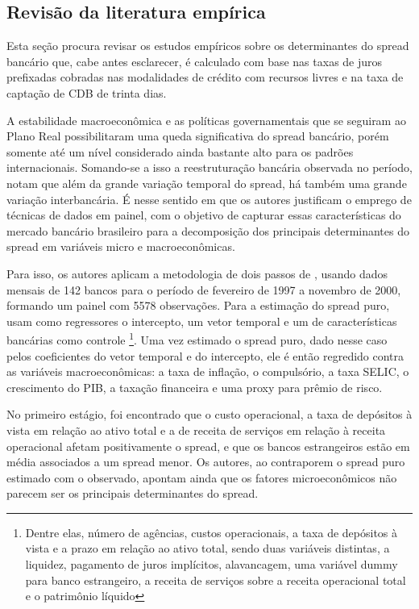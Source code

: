\documentclass[a4paper, article, 12pt, openany, oneside, english, brazil]{abntex2}
\numberwithin{equation}{section}
\begin{document}
\subsection{Revisão da literatura empírica}

    Esta seção procura revisar os estudos empíricos sobre os determinantes do spread bancário que, cabe antes esclarecer, é calculado com base nas taxas de juros prefixadas cobradas nas modalidades de crédito com recursos livres e na taxa de captação de CDB de trinta dias.

    A estabilidade macroeconômica e as políticas governamentais que se seguiram ao Plano Real possibilitaram uma queda significativa do spread bancário, porém somente até um nível considerado ainda bastante alto para os padrões internacionais. Somando-se a isso a reestruturação bancária observada no período,  notam que além da grande variação temporal do spread, há também uma grande variação interbancária. É nesse sentido em que os autores justificam o emprego de técnicas de dados em painel, com o objetivo de capturar essas características do mercado bancário brasileiro para a decomposição dos principais determinantes do spread em variáveis micro e macroeconômicas.

    Para isso, os autores aplicam a metodologia de dois passos de , usando dados mensais de 142 bancos para o período de fevereiro de 1997 a novembro de 2000, formando um painel com 5578 observações. Para a estimação do spread puro, usam como regressores o intercepto, um vetor temporal e um de características bancárias como controle \footnote{Dentre elas, número de agências, custos operacionais, a taxa de depósitos à vista e a prazo em relação ao ativo total, sendo duas variáveis distintas, a liquidez, pagamento de juros implícitos, alavancagem, uma variável dummy para banco estrangeiro, a receita de serviços sobre a receita operacional total e o patrimônio líquido}. Uma vez estimado o spread puro, dado nesse caso pelos coeficientes do vetor temporal e do intercepto, ele é então regredido contra as variáveis macroeconômicas: a taxa de inflação, o compulsório, a taxa SELIC, o crescimento do PIB, a taxação financeira e uma proxy para prêmio de risco.

    No primeiro estágio, foi encontrado que o custo operacional, a taxa de depósitos à vista em relação ao ativo total e a de receita de serviços em relação à receita operacional afetam positivamente o spread, e que os bancos estrangeiros estão em média associados a um spread menor. Os autores, ao contraporem o spread puro estimado com o observado, apontam ainda que os fatores microeconômicos não parecem ser os principais determinantes do spread.
    
\end{document}
